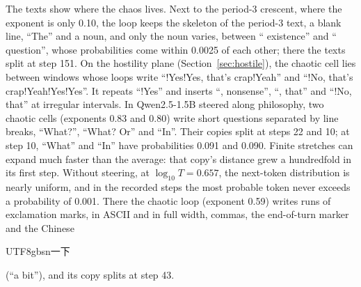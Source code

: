 \documentclass[11pt,letterpaper]{article}
\begin{document}
The texts show where the chaos lives. Next to the period-3 crescent, where the exponent is only 0.10, the loop keeps
the skeleton of the period-3 text, a blank line, ``The'' and a noun, and only the noun varies, between `` existence''
and `` question'', whose probabilities come within 0.0025 of each other; there the texts split at step 151. On the
hostility plane (Section~\ref{sec:hostile}), the chaotic cell lies between windows whose loops write ``!Yes!Yes, that's
crap!Yeah'' and ``!No, that's crap!Yeah!Yes!Yes''. It repeats ``!Yes'' and inserts ``, nonsense'', ``, that'' and
``!No, that'' at irregular intervals.
In Qwen2.5-1.5B steered along philosophy, two chaotic cells (exponents 0.83 and 0.80) write short questions
separated by line breaks, ``What?'', ``What? Or'' and ``In''. Their copies split at steps 22 and 10; at step 10,
``What'' and ``In'' have probabilities 0.091 and 0.090. Finite stretches can expand much faster than the average: that
copy's distance grew a hundredfold in its first step. Without steering, at $\log_{10}T=0.657$, the next-token
distribution is nearly uniform, and in the recorded steps the most probable token never exceeds a probability of 0.001.
There the chaotic loop (exponent 0.59) writes runs of exclamation marks, in ASCII and in full width, commas, the
end-of-turn marker and the Chinese \begin{CJK}{UTF8}{gbsn}一下\end{CJK} (``a bit''), and its copy splits at step 43.
\end{document}
